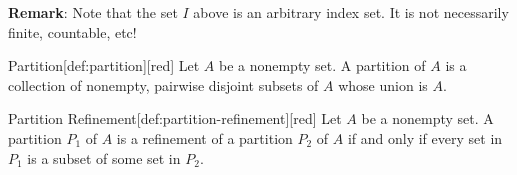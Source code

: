 \textbf{Remark}: Note that the set $I$ above is an arbitrary index set. It is not necessarily finite, countable, etc!




\begin{define}{Partition}[def:partition][red]
  Let $A$ be a nonempty set. A partition of $A$ is a collection of nonempty, pairwise disjoint subsets of $A$ whose union is $A$.
\end{define}

\begin{define}{Partition Refinement}[def:partition-refinement][red]
  Let $A$ be a nonempty set. A partition $P_1$ of $A$ is a refinement of a partition $P_2$ of $A$ if and only if every set in $P_1$ is a subset of some set in $P_2$.
\end{define}





